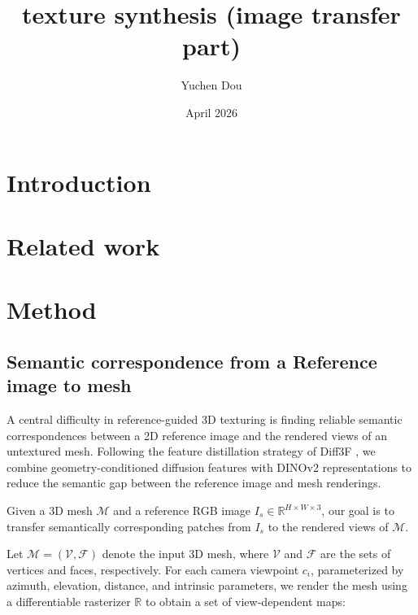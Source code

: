 \documentclass{article}
\title{texture synthesis (image transfer part)}
\author{Yuchen Dou }
\date{April 2026}
\begin{document}
\maketitle

\section{Introduction}

\section{Related work}


\section{Method}


\subsection{Semantic correspondence from a Reference image to mesh}
A central difficulty in reference-guided 3D texturing is finding reliable semantic correspondences between a 2D reference image and the rendered views of an untextured mesh. Following the feature distillation strategy of Diff3F \cite{dutt2024diffusion}, we combine geometry-conditioned diffusion features\cite{rombach2022high} with DINOv2 representations \cite{oquab2023dinov2} to reduce the semantic gap between the reference image and mesh renderings. 

Given a 3D mesh $\mathcal{M}$ and a reference RGB image $I_s \in \mathbb{R}^{H \times W \times 3}$, our goal is to transfer semantically corresponding patches from $I_s$ to the rendered views of $\mathcal{M}$.

Let $\mathcal{M} = (\mathcal{V}, \mathcal{F})$ denote the input 3D mesh, where $\mathcal{V}$ and $\mathcal{F}$ are the sets of vertices and faces, respectively. For each camera viewpoint $c_i$, parameterized by azimuth, elevation, distance, and intrinsic parameters, we render the mesh using a differentiable rasterizer $\mathbb{R}$ to obtain a set of view-dependent maps:
\end{document}
